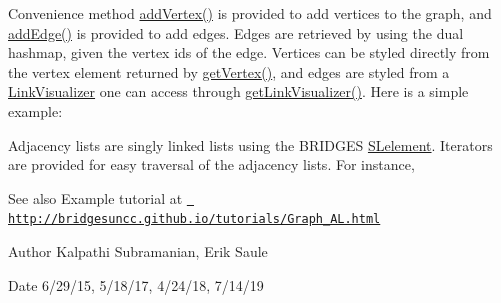 Convenience method \mbox{\hyperlink{classbridges_1_1base_1_1_graph_adj_list_aca59a3c40af4ae82716ebbfa1751f267}{add\+Vertex()}} is provided to add vertices to the graph, and \mbox{\hyperlink{classbridges_1_1base_1_1_graph_adj_list_a43041976184920e1db1dbe3ad696c6cd}{add\+Edge()}} is provided to add edges. Edges are retrieved by using the dual hashmap, given the vertex ids of the edge. Vertices can be styled directly from the vertex element returned by \mbox{\hyperlink{classbridges_1_1base_1_1_graph_adj_list_aa19cd300a85b05352bdf58720310a112}{get\+Vertex()}}, and edges are styled from a \mbox{\hyperlink{classbridges_1_1base_1_1_link_visualizer}{Link\+Visualizer}} one can access through \mbox{\hyperlink{classbridges_1_1base_1_1_graph_adj_list_af93888dbd2a768a2401619ad5dc95560}{get\+Link\+Visualizer()}}. Here is a simple example\+:


\begin{DoxyCode}{0}
\end{DoxyCode}


Adjacency lists are singly linked lists using the B\+R\+I\+D\+G\+ES \mbox{\hyperlink{classbridges_1_1base_1_1_s_lelement}{S\+Lelement}}. Iterators are provided for easy traversal of the adjacency lists. For instance,


\begin{DoxyCode}{0}
\end{DoxyCode}


\begin{DoxySeeAlso}{See also}
Example tutorial at \href{http://bridgesuncc.github.io/tutorials/Graph_AL.html}{\texttt{ http\+://bridgesuncc.\+github.\+io/tutorials/\+Graph\+\_\+\+A\+L.\+html}}
\end{DoxySeeAlso}
\begin{DoxyAuthor}{Author}
Kalpathi Subramanian, Erik Saule
\end{DoxyAuthor}
\begin{DoxyDate}{Date}
6/29/15, 5/18/17, 4/24/18, 7/14/19
\end{DoxyDate}

